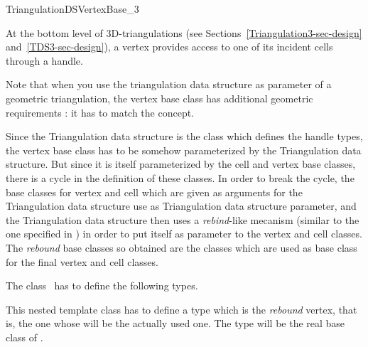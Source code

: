 

\begin{ccRefConcept}{TriangulationDSVertexBase_3}


\ccDefinition
  
At the bottom level of 3D-triangulations 
(see Sections~\ref{Triangulation3-sec-design} and~\ref{TDS3-sec-design}),
a vertex provides access to one of its incident cells through a handle.

Note that when you use the triangulation data structure as parameter of a
geometric triangulation, the vertex base class has additional geometric
requirements : it has to match the  concept.

Since the Triangulation data structure is the class which defines the handle
types, the vertex base class has to be somehow parameterized by the
Triangulation data structure.  But since it is itself parameterized by the cell
and vertex base classes, there is a cycle in the definition of these classes.
In order to break the cycle, the base classes for vertex and cell which are
given as arguments for the Triangulation data structure use  as
Triangulation data structure parameter, and the Triangulation data structure
then uses a {\it rebind}-like mecanism (similar to the one specified in
) in order to put itself as parameter to the vertex and
cell classes.  The {\it rebound} base classes so obtained are the classes which
are used as base class for the final vertex and cell classes.

\ccTypes
{}
\ccThreeToTwo
The class \ccRefName\ has to define the following types.

{This nested template class has to define a type  which is the
{\it rebound} vertex, that is, the one whose 
will be the actually used one.  The  type will be the real base
class of .}


\end{ccRefConcept}
